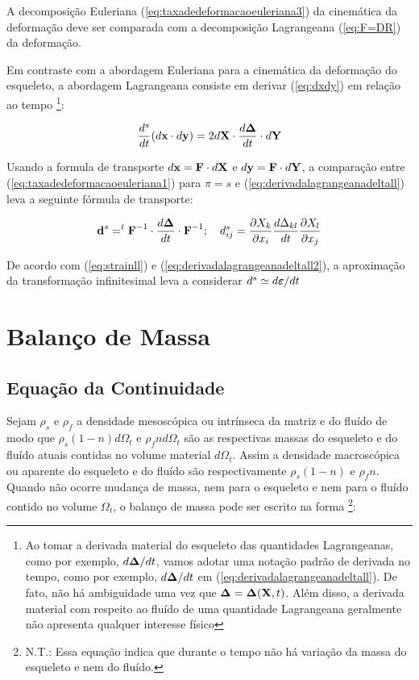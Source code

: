 \documentclass[
	11pt, %
	fleqn, %
	a4paper, %
]{LegrandOrangeBook}
\begin{document}
A decomposição Euleriana (\ref{eq:taxadedeformacaoeuleriana3}) da cinemática da deformação deve ser comparada com a decomposição Lagrangeana (\ref{eq:F=DR}) da deformação.

Em contraste com a abordagem Euleriana para a cinemática da deformação do esqueleto, a abordagem Lagrangeana consiste em derivar (\ref{eq:dxdy}) em relação ao tempo \footnote{Ao tomar a derivada material do esqueleto das quantidades Lagrangeanas, como por exemplo, $d\bm{\Delta}/dt$, vamos adotar uma notação padrão de derivada no tempo, como por exemplo, $d\bm{\Delta}/dt$ em (\ref{eq:derivadalagrangeanadeltall}). De fato, não há ambiguidade uma vez que $\bm{\Delta} = \bm{\Delta}(\textbf{X},t)$. Além disso, a derivada material com respeito ao fluído de uma quantidade Lagrangeana geralmente não apresenta qualquer interesse físico}:

\begin{equation}
	\label{eq:derivadalagrangeanadeltall}	
	\dfrac{d^s}{dt}(d\textbf{x} \cdot d\textbf{y}) = 2d\textbf{X} \cdot \dfrac{d\bm{\Delta}}{dt} \cdot d\textbf{Y}
\end{equation}

Usando a formula de transporte $d\textbf{x} = \textbf{F} \cdot d\textbf{X}$ e $d\textbf{y} = \textbf{F} \cdot d\textbf{Y}$, a comparação entre (\ref{eq:taxadedeformacaoeuleriana1}) para $\pi = s$ e (\ref{eq:derivadalagrangeanadeltall}) leva a seguinte fórmula de transporte:

\begin{equation}
	\label{eq:derivadalagrangeanadeltall2}	
	\textbf{d}^s = ^{t}\textbf{F}^{-1} \cdot \dfrac{d\bm{\Delta}}{dt} \cdot \textbf{F}^{-1}; ~~~ d_{ij}^s = \dfrac{\partial X_k}{\partial x_i}\dfrac{d\Delta_{kl}}{dt}\dfrac{\partial X_l}{\partial x_j}
\end{equation}

De acordo com (\ref{eq:strainll}) e (\ref{eq:derivadalagrangeanadeltall2}), a aproximação da transformação infinitesimal leva a considerar $d^s \simeq d\bm{\varepsilon}/dt$

\section{Balanço de Massa}

\subsection{Equação da Continuidade}

Sejam $\rho_s$ e $\rho_f$ a densidade mesoscópica ou intrínseca da matriz e do fluído de modo que $\rho_s(1-n)d\Omega_t$ e $\rho_f n d\Omega_t$ são as respectivas massas do esqueleto e do fluído atuais contidas no volume material $d\Omega_t$. Assim a densidade macroscópica ou aparente do esqueleto e do fluído são respectivamente $\rho_s(1-n)$ e $\rho_f n$. Quando não ocorre mudança de massa, nem para o esqueleto e nem para o fluído contido no volume $\Omega_t$, o balanço de massa pode ser escrito na forma \footnote{N.T.: Essa equação indica que durante o tempo não há variação da massa do esqueleto e nem do fluído.}:
\end{document}
